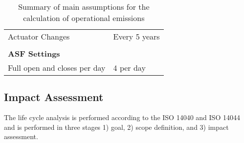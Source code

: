 \begin{description}
\begin{table}[H]
\begin{tabular}{ll}
Actuator Changes              & Every 5 years                                  \\
                              &                                                \\
\textbf{ASF Settings}         &                                                \\
Full open and closes per day  & 4 per day                                      \\
\hline
\end{tabular}
\caption{Summary of main assumptions for the calculation of operational emissions}
\label{tab:AssumptionsOpp}
\end{table}


\end{description}

\subsection{Impact Assessment}
The life cycle analysis is performed according to the ISO 14040 and ISO 14044 and is performed in three stages 1) goal, 2) scope definition, and 3) impact assessment.

